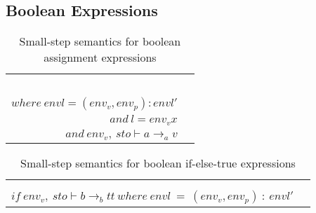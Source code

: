 \subsection{Boolean Expressions}
\begin{table}[H]
    \centering
    \begin{longtable}[c] { r c }
    \begin{tabular}{@{}c@{}} 
    [ASS1] \\
    \newline \\
    \newline \\
    \newline \\
    \end{tabular}
  \begin{tabular}{@{}c@{}}   \( \langle x := a, sto, env_l \rangle \Rightarrow (sto[l \mapsto v], envl) \)  \\ \( where \ envl  = (env_v, env_p) : envl' \)
  \\ \( and \ l = env_v x \)
  \\ \( and \ env_v, \ sto \vdash a \rightarrow_a v \)
  \end{tabular}
        
 \end{longtable}
    \caption{Small-step semantics for boolean assignment expressions}\label{tab:my_label}
\end{table}
        
        
        
\begin{table}[H]
    \centering
    \begin{longtable}[c] { r c }
    
    \begin{tabular}{@{}c@{}} 
    [IF-ELSE-TRUE] \\
    \newline
    \end{tabular}
  \begin{tabular}{@{}c@{}}   \(
  \langle if \ {b} \ then \ {S_1} \ else \ {S_2} \ sto, envl\rangle \Rightarrow \langle{S_1},sto,envl\rangle
  \)  \\ \(
  if \ env_v, \ sto \vdash b \rightarrow_b {tt} \ where \ envl \ = \ (env_v, env_p) \ : \ envl' 
  \) 
  \end{tabular}
        
 \end{longtable}
    \caption{Small-step semantics for boolean if-else-true expressions}\label{tab:my_label}
\end{table}


